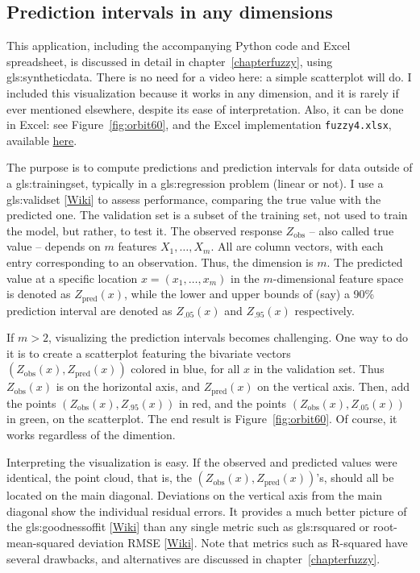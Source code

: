 \documentclass[oneside,10pt]{book}
\begin{document}
\subsection{Prediction intervals in any dimensions}

This application, including the accompanying Python code and Excel spreadsheet, is discussed in detail in chapter~\ref{chapterfuzzy}, using \gls{gls:syntheticdata}. There is no need for a video here: a simple
scatterplot will do. I included this visualization because it works in any dimension, and it is rarely if ever mentioned elsewhere, despite its ease of interpretation. Also, it can be done in Excel: see Figure~\ref{fig:orbit60}, and the 
Excel implementation \texttt{fuzzy4.xlsx}, available \href{https://ln5.sync.com/dl/0caeb8e10/mztnibg9-xrkdks7g-r8bsgabw-3fsizwif}{here}.

The purpose is to compute predictions and prediction intervals for data outside of a \gls{gls:trainingset}, typically in a \gls{gls:regression} problem (linear or not). I  use a \gls{gls:validset} [\href{https://en.wikipedia.org/wiki/Training,_validation,_and_test_data_sets}{Wiki}] to assess performance, comparing the true value with the predicted one. The validation set is a subset of the training set, not used to train the model, but rather, to test it. The observed response $Z_\text{obs}$ -- also called true value -- depends on $m$ features $X_1,\dots,X_m$. All are column vectors, with each entry corresponding to an observation.  Thus, the dimension is $m$. The predicted
value at a specific location $x=(x_1,\dots,x_m)$ in the $m$-dimensional feature space is denoted as $Z_\text{pred}(x)$, while the lower and upper bounds of (say) a 90\% prediction interval are denoted as $Z_\text{.05}(x)$ and $Z_\text{.95}(x)$ respectively.

If $m>2$, visualizing the prediction intervals becomes challenging. One way to do it is to create a scatterplot featuring the bivariate vectors 
$(Z_\text{obs}(x), Z_\text{pred}(x))$ colored in blue, for all $x$ in the validation set. Thus $Z_\text{obs}(x)$ is on the horizontal axis, and $Z_\text{pred}(x)$ on the vertical axis. 
Then, add the points $(Z_\text{obs}(x),Z_\text{.95}(x))$ in red, and the points $(Z_\text{obs}(x),Z_\text{.05}(x))$ in green, on the scatterplot. 
The end result is Figure~\ref{fig:orbit60}. Of course, it works regardless of the dimention.

Interpreting the visualization is easy. If the observed and predicted values were identical, the point cloud, that is, the $(Z_\text{obs}(x),Z_\text{pred}(x))$'s, should all be located on the main diagonal. Deviations on the vertical axis from the main diagonal show the individual residual errors. It provides a much better picture of the  \gls{gls:goodnessoffit} [\href{https://en.wikipedia.org/wiki/Goodness_of_fit}{Wiki}]
than any single metric such as \gls{gls:rsquared} or root-mean-squared deviation \textcolor{index}{RMSE} [\href{https://en.wikipedia.org/wiki/Root-mean-square_deviation}{Wiki}]. Note that metrics such as R-squared have several drawbacks, and alternatives are discussed in chapter~\ref{chapterfuzzy}. 
\end{document}
